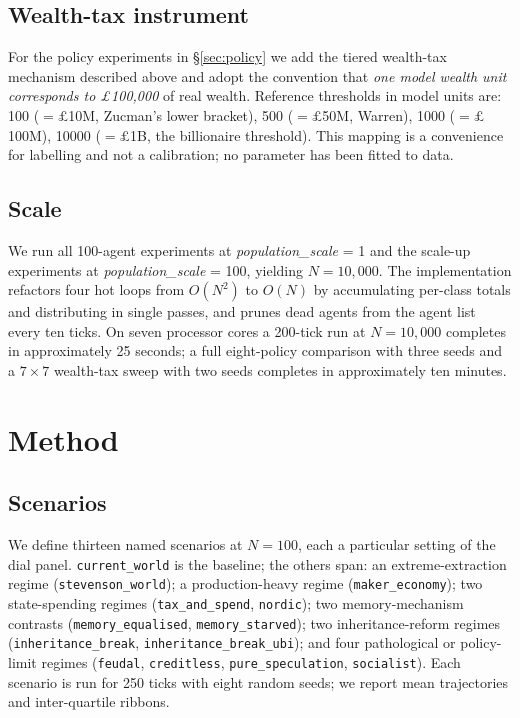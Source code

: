 \documentclass[11pt]{article}
\begin{document}
\subsection{Wealth-tax instrument}

For the policy experiments in \S\ref{sec:policy} we add the tiered
wealth-tax mechanism described above and adopt the convention that
\emph{one model wealth unit corresponds to \pounds100{,}000} of real
wealth. Reference thresholds in model units are: 100 ($=\pounds$10M,
Zucman's lower bracket), 500 ($=\pounds$50M, Warren), 1000
($=\pounds$100M), 10000 ($=\pounds$1B, the billionaire threshold).
This mapping is a convenience for labelling and not a calibration;
no parameter has been fitted to data.

\subsection{Scale}

We run all 100-agent experiments at \emph{population\_scale} = 1 and
the scale-up experiments at \emph{population\_scale} = 100, yielding
$N=10{,}000$. The implementation refactors four hot loops from
$O(N^2)$ to $O(N)$ by accumulating per-class totals and distributing
in single passes, and prunes dead agents from the agent list every
ten ticks. On seven processor cores a 200-tick run at $N=10{,}000$
completes in approximately 25 seconds; a full eight-policy comparison
with three seeds and a $7\times 7$ wealth-tax sweep with two seeds
completes in approximately ten minutes.

\section{Method}
\label{sec:method}

\subsection{Scenarios}

We define thirteen named scenarios at $N=100$, each a particular setting
of the dial panel. \texttt{current\_world} is the baseline; the others
span: an extreme-extraction regime (\texttt{stevenson\_world}); a
production-heavy regime (\texttt{maker\_economy}); two state-spending
regimes (\texttt{tax\_and\_spend}, \texttt{nordic}); two memory-mechanism
contrasts (\texttt{memory\_equalised}, \texttt{memory\_starved}); two
inheritance-reform regimes (\texttt{inheritance\_break},
\texttt{inheritance\_break\_ubi}); and four pathological or
policy-limit regimes (\texttt{feudal}, \texttt{creditless},
\texttt{pure\_speculation}, \texttt{socialist}). Each scenario is run
for 250 ticks with eight random seeds; we report mean trajectories
and inter-quartile ribbons.
\end{document}
